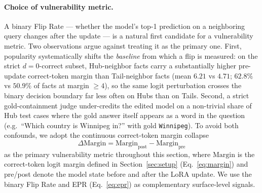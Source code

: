\paragraph{Choice of vulnerability metric.}
A binary Flip Rate — whether the model's top-1 prediction on a neighboring query changes after the update — is a natural first candidate for a vulnerability metric. Two observations argue against treating it as the primary one. First, popularity systematically shifts the \emph{baseline} from which a flip is measured: on the strict $d{=}0$-correct subset, Hub-neighbor facts carry a substantially higher pre-update correct-token margin than Tail-neighbor facts (mean $6.21$ vs $4.71$; $62.8\%$ vs $50.9\%$ of facts at margin $\ge 4$), so the same logit perturbation crosses the binary decision boundary far less often on Hubs than on Tails. Second, a strict gold-containment judge under-credits the edited model on a non-trivial share of Hub test cases where the gold answer itself appears as a word in the question (e.g.\ ``Which country is Winnipeg in?'' with gold \texttt{Winnipeg}). To avoid both confounds, we adopt the continuous correct-token margin collapse
\begin{equation}
    \Delta\mathrm{Margin} = \mathrm{Margin}_{\text{post}} - \mathrm{Margin}_{\text{pre}}
    \label{eq:delta_margin}
\end{equation}
as the primary vulnerability metric throughout this section, where $\mathrm{Margin}$ is the correct-token logit margin defined in Section~\ref{sec:setup} (Eq.~\ref{eq:margin}) and pre/post denote the model state before and after the LoRA update. We use the binary Flip Rate and EPR (Eq.~\ref{eq:epr}) as complementary surface-level signals.

